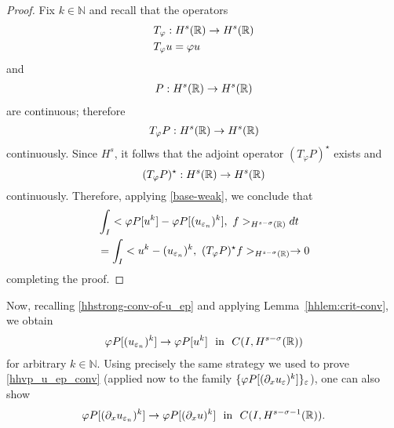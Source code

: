 \begin{proof} 
Fix $k \in \mathbb{N}$ and recall that the operators 
\begin{equation*}
\begin{split}
& T_\varphi: H^s(\mathbb{R}) \to H^s(\mathbb{R})\\
& T_\varphi u = \varphi u
\end{split}
\end{equation*}
and 
\begin{equation*}
\begin{split}
P:H^s(\mathbb{R}) \to H^s(\mathbb{R})
\end{split}
\end{equation*}
are continuous; therefore 
\begin{equation*}
\begin{split}
T_\varphi P: H^s(\mathbb{R}) \to H^s(\mathbb{R})
\end{split}
\end{equation*}
continuously. Since $H^{s}$, it follws that the adjoint operator $(T_\varphi P)^{\star}$
exists and
\begin{equation*}
(T_\varphi P)^{\star}: H^s(\mathbb{R}) \to H^s(\mathbb{R}) 
\end{equation*}
continuously. Therefore, applying \eqref{base-weak}, we conclude that
\begin{equation}
\label{widpseudo}
\begin{split}
& \int_I <\varphi P[u^k] - \varphi
P [(u_{\varepsilon_n})^k],\  f>_{H^{s-\sigma }(\mathbb{R})} dt
\\
&= \int_I <u^k - 
(u_{\varepsilon_n})^k, \ (T_\varphi P)^{\star} f>_{H^{s-\sigma }(\mathbb{R})} \to 0
\end{split}
\end{equation}
completing the proof. 
\end{proof}
%
%
Now, recalling \eqref{hhstrong-conv-of-u_ep} and applying Lemma~\ref{hhlem:crit-conv}, we obtain
\begin{equation}
\begin{split}
\varphi P [(u_{\varepsilon_n})^k] \to \varphi P [u^k] \ \ \text{in}  \ \ C(I,
H^{s-\sigma}(\mathbb{R}))
\label{hhvp_u_ep_conv}
\end{split}
\end{equation}
for arbitrary $k \in \mathbb{N}$.  Using precisely the same
strategy we used to prove \eqref{hhvp_u_ep_conv} (applied now to
the family $\{ \varphi P [(\partial_x u_{\varepsilon})^k] \}_\varepsilon$), one can also show
\begin{equation}
\begin{split}
\vp P [ (\p_x u_{\ee_n})^k] \to \vp P [(\p_x u)^k] \ \ \text{in}  \ \ C(I,
H^{s-\sigma -1 }(\rr)).
\end{split}
\end{equation}
